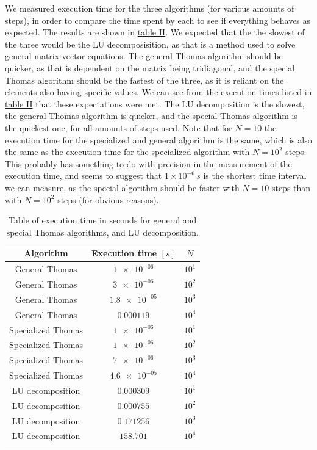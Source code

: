\documentclass[english,notitlepage,reprint,nofootinbib]{revtex4-1}  %
\begin{document}
We measured execution time for the three algorithms (for various amounts of steps), in order to compare the time spent by each to see if everything behaves as expected. The results are shown in \hyperref[table:iv:c:1]{table II}. We expected that the the slowest of the three would be the LU decomposisition, as that is a method used to solve general matrix-vector equations. The general Thomas algorithm should be quicker, as that is dependent on the matrix being tridiagonal, and the special Thomas algorithm should be the fastest of the three, as it is reliant on the elements also having specific values. We can see from the execution times listed in \hyperref[table:iv:c:1]{table II} that these expectations were met. The LU decomposition is the slowest, the general Thomas algorithm is quicker, and the special Thomas algorithm is the quickest one, for all amounts of steps used. Note that for $N=10$ the execution time for the specialized and general algorithm is the same, which is also the same as the execution time for the specialized algorithm with $N=10^2$ steps. This probably has something to do with precision in the measurement of the execution time, and seems to suggest that $1 \times 10^{-6}\, s$ is the shortest time interval we can measure, as the special algorithm should be faster with $N=10$ steps than with $N=10^2$ steps (for obvious reasons).


\begin{table}[H]
	\centering
	\label{table:iv:c:1}
	\caption{Table of execution time in seconds for general and special Thomas algorithms, and LU decomposition.}

	\begin{tabular}{|c|c|c|}
		\hline
		Algorithm & Execution time \([s]\) & \(N\) \\\hline
		General Thomas & \(\num{1e-06}\) & \(10^{1}\) \\
		General Thomas & \(\num{3e-06}\) & \(10^{2}\) \\
		General Thomas & \(\num{1.8e-05}\) & \(10^{3}\) \\
		General Thomas & \(\num{0.000119}\) & \(10^{4}\) \\\hline
		Specialized Thomas & \(\num{1e-06}\) & \(10^{1}\) \\
		Specialized Thomas & \(\num{1e-06}\) & \(10^{2}\) \\
		Specialized Thomas & \(\num{7e-06}\) & \(10^{3}\) \\
		Specialized Thomas & \(\num{4.6e-05}\) & \(10^{4}\) \\\hline
		LU decomposition & \(\num{0.000309}\) & \(10^{1}\) \\
		LU decomposition & \(\num{0.000755}\) & \(10^{2}\) \\
		LU decomposition & \(\num{0.171256}\) & \(10^{3}\) \\
		LU decomposition & \(\num{158.701}\) & \(10^{4}\) \\\hline
	\end{tabular}

\end{table}
\end{document}
